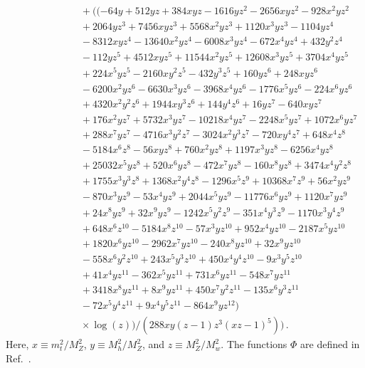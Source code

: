 \documentclass[letter,11pt,DIV=12,abstract=true,numbers=noenddot,titlepage=false,twocolumn=false,draft=false]{scrartcl}
\begin{document}
\begin{equation}
\begin{split}
      & \qquad \qquad \qquad + ((-64 y + 512 y z + 384 x y z - 1616 y z^2 - 2656 x y z^2 - 928 x^2 y z^2\\
      & \qquad \qquad \qquad + 2064 y z^3 + 7456 x y z^3 + 5568 x^2 y z^3 + 1120 x^3 y z^3 - 1104 y z^4\\
      & \qquad \qquad \qquad - 8312 x y z^4 - 13640 x^2 y z^4 - 6008 x^3 y z^4 - 672 x^4 y z^4 + 432 y^2 z^4\\
      & \qquad \qquad \qquad - 112 y z^5 + 4512 x y z^5 + 11544 x^2 y z^5 + 12608 x^3 y z^5 + 3704 x^4 y z^5\\
      & \qquad \qquad \qquad + 224 x^5 y z^5 - 2160 x y^2 z^5 - 432 y^3 z^5 + 160 y z^6 + 248 x y z^6\\
      & \qquad \qquad \qquad - 6200 x^2 y z^6 - 6630 x^3 y z^6 - 3968 x^4 y z^6 - 1776 x^5 y z^6 - 224 x^6 y z^6\\
      & \qquad \qquad \qquad + 4320 x^2 y^2 z^6 + 1944 x y^3 z^6 + 144 y^4 z^6 + 16 y z^7 - 640 x y z^7\\
      & \qquad \qquad \qquad + 176 x^2 y z^7 + 5732 x^3 y z^7 - 10218 x^4 y z^7 - 2248 x^5 y z^7 + 1072 x^6 y z^7\\
      & \qquad \qquad \qquad + 288 x^7 y z^7 - 4716 x^3 y^2 z^7 - 3024 x^2 y^3 z^7 - 720 x y^4 z^7 + 648 x^4 z^8\\
      & \qquad \qquad \qquad - 5184 x^6 z^8 - 56 x y z^8 + 760 x^2 y z^8 + 1197 x^3 y z^8 - 6256 x^4 y z^8\\
      & \qquad \qquad \qquad + 25032 x^5 y z^8 + 520 x^6 y z^8 - 472 x^7 y z^8 - 160 x^8 y z^8 + 3474 x^4 y^2 z^8\\
      & \qquad \qquad \qquad + 1755 x^3 y^3 z^8 + 1368 x^2 y^4 z^8 - 1296 x^5 z^9 + 10368 x^7 z^9 + 56 x^2 y z^9\\
      & \qquad \qquad \qquad - 870 x^3 y z^9 - 53 x^4 y z^9 + 2044 x^5 y z^9 - 11776 x^6 y z^9 + 1120 x^7 y z^9\\
      & \qquad \qquad \qquad + 24 x^8 y z^9 + 32 x^9 y z^9 - 1242 x^5 y^2 z^9 - 351 x^4 y^3 z^9 - 1170 x^3 y^4 z^9\\
      & \qquad \qquad \qquad + 648 x^6 z^{10} - 5184 x^8 z^{10} - 57 x^3 y z^{10} + 952 x^4 y z^{10} - 2187 x^5 y z^{10}\\
      & \qquad \qquad \qquad + 1820 x^6 y z^{10} - 2962 x^7 y z^{10} - 240 x^8 y z^{10} + 32 x^9 y z^{10}\\
      & \qquad \qquad \qquad - 558 x^6 y^2 z^{10} + 243 x^5 y^3 z^{10} + 450 x^4 y^4 z^{10} - 9 x^3 y^5 z^{10}\\
      & \qquad \qquad \qquad + 41 x^4 y z^{11} - 362 x^5 y z^{11} + 731 x^6 y z^{11} - 548 x^7 y z^{11}\\
      & \qquad \qquad \qquad + 3418 x^8 y z^{11} + 8 x^9 y z^{11} + 450 x^7 y^2 z^{11} - 135 x^6 y^3 z^{11}\\
      & \qquad \qquad \qquad - 72 x^5 y^4 z^{11} + 9 x^4 y^5 z^{11} - 864 x^9 y z^{12})\\
      & \qquad \qquad \qquad \times \log(z))/(288 x y (z-1) z^3 (x z-1)^5) )\,.
\end{split}
\end{equation}
Here, $x \equiv m_t^2/M_Z^2$, $y \equiv M_h^2/M_Z^2$, and $z \equiv
M_Z^2/M_w^2$. The functions $\Phi$ are defined in
Ref.~\cite{Davydychev:1992mt}.



\end{document}
